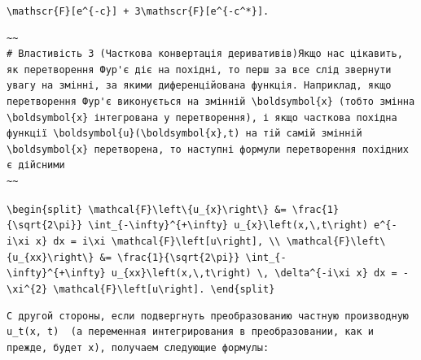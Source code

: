 \documentclass[
  ukrainian,
]{article}
\begin{document}
\texttt{\textbackslash{}mathscr\{F\}{[}e\^{}\{-c\}{]}\ +\ 3\textbackslash{}mathscr\{F\}{[}e\^{}\{-c\^{}*\}{]}.}

\begin{verbatim}
~~
# Властивість 3 (Часткова конвертація деривативів)Якщо нас цікавить, як перетворення Фур'є діє на похідні, то перш за все слід звернути увагу на змінні, за якими диференційована функція. Наприклад, якщо перетворення Фур'є виконується на змінній \boldsymbol{x} (тобто змінна \boldsymbol{x} інтегрована у перетворення), і якщо часткова похідна функції \boldsymbol{u}(\boldsymbol{x},t) на тій самій змінній \boldsymbol{x} перетворена, то наступні формули перетворення похідних є дійсними
~~
\end{verbatim}

\texttt{\textbackslash{}begin\{split\}\ \textbackslash{}mathcal\{F\}\textbackslash{}left\textbackslash{}\{u\_\{x\}\textbackslash{}right\textbackslash{}\}\ \&=\ \textbackslash{}frac\{1\}\{\textbackslash{}sqrt\{2\textbackslash{}pi\}\}\ \textbackslash{}int\_\{-\textbackslash{}infty\}\^{}\{+\textbackslash{}infty\}\ u\_\{x\}\textbackslash{}left(x,\textbackslash{},t\textbackslash{}right)\ e\^{}\{-i\textbackslash{}xi\ x\}\ dx\ =\ i\textbackslash{}xi\ \textbackslash{}mathcal\{F\}\textbackslash{}left{[}u\textbackslash{}right{]},\ \textbackslash{}\textbackslash{}\ \textbackslash{}mathcal\{F\}\textbackslash{}left\textbackslash{}\{u\_\{xx\}\textbackslash{}right\textbackslash{}\}\ \&=\ \textbackslash{}frac\{1\}\{\textbackslash{}sqrt\{2\textbackslash{}pi\}\}\ \textbackslash{}int\_\{-\textbackslash{}infty\}\^{}\{+\textbackslash{}infty\}\ u\_\{xx\}\textbackslash{}left(x,\textbackslash{},t\textbackslash{}right)\ \textbackslash{},\ \textbackslash{}delta\^{}\{-i\textbackslash{}xi\ x\}\ dx\ =\ -\textbackslash{}xi\^{}\{2\}\ \textbackslash{}mathcal\{F\}\textbackslash{}left{[}u\textbackslash{}right{]}.\ \textbackslash{}end\{split\}}

\begin{verbatim}
С другой стороны, если подвергнуть преобразованию частную производную  u_t(x, t)  (а переменная интегрирования в преобразовании, как и прежде, будет x), получаем следующие формулы:
\end{verbatim}
\end{document}
